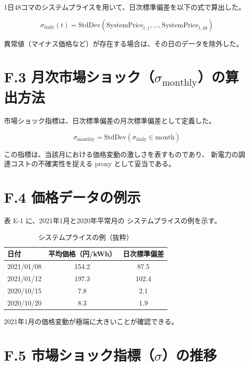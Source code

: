 1日48コマのシステムプライスを用いて、日次標準偏差を以下の式で算出した。



\[
\sigma_{\mathrm{daily}}(t)
=
\mathrm{StdDev}
\left(
\mathrm{SystemPrice}_{t,1},\ldots,\mathrm{SystemPrice}_{t,48}
\right)
\]



異常値（マイナス価格など）が存在する場合は、その日のデータを除外した。

\section*{F.3 月次市場ショック（$\sigma_{\mathrm{monthly}}$）の算出方法}

市場ショック指標は、日次標準偏差の月次標準偏差として定義した。



\[
\sigma_{\mathrm{monthly}}
=
\mathrm{StdDev}\left(\sigma_{\mathrm{daily}} \in \text{month}\right)
\]



この指標は、当該月における価格変動の激しさを表すものであり、
新電力の調達コストの不確実性を捉える proxy として妥当である。

\section*{F.4 価格データの例示}

表 E-1 に、2021年1月と2020年平常月の
システムプライスの例を示す。

\begin{table}[H]
\centering
\caption{システムプライスの例（抜粋）}
\begin{tabular}{lcc}
\toprule
日付 & 平均価格（円/kWh） & 日次標準偏差 \\
\midrule
2021/01/08 & 154.2 & 87.5 \\
2021/01/12 & 197.3 & 102.4 \\
2020/10/15 & 7.8 & 2.1 \\
2020/10/20 & 8.3 & 1.9 \\
\bottomrule
\end{tabular}
\end{table}

2021年1月の価格変動が極端に大きいことが確認できる。

\section*{F.5 市場ショック指標（$\sigma$）の推移}

